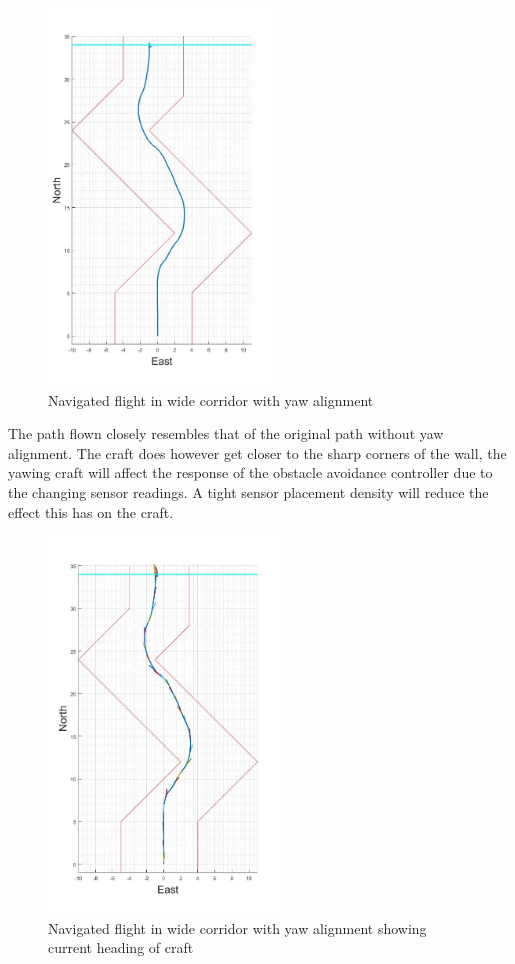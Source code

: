 			\begin{figure}[H]
				\centering
				\includegraphics[height = 10cm]{../References/Testing/WideCorridorYawAlign3D.jpg}     
				\caption{Navigated flight in wide corridor with yaw alignment}
				\label{IM_Test33}
			\end{figure}
			
			The path flown closely resembles that of the original path without yaw alignment. The craft does however get closer to the sharp corners of the wall, the yawing craft will affect the response of the obstacle avoidance controller due to the changing sensor readings. A tight sensor placement density will reduce the effect this has on the craft.
			
			\begin{figure}[H]
				\centering
				\includegraphics[height = 10cm]{../References/Testing/WideCorridorYawAlign3DAlign.jpg}     
				\caption{Navigated flight in wide corridor with yaw alignment showing current heading of craft}
				\label{IM_Test34}
			\end{figure}
			
